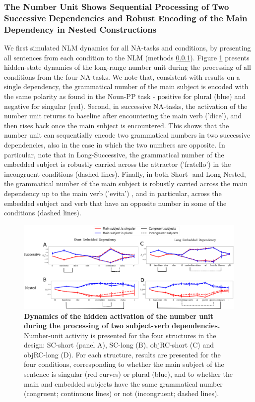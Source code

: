 \subsubsection{The Number Unit Shows Sequential Processing of Two Successive Dependencies and Robust Encoding of the Main Dependency in Nested Constructions}
We first simulated NLM dynamics for all NA-tasks and conditions, by presenting all sentences from each condition to the NLM (methods \ref{}). Figure \ref{fig:2by2_dynamics} presents hidden-state dynamics  of the long-range number unit during the processing of all conditions from the four NA-tasks. We note that, consistent with results on a single dependency, the grammatical number of the main subject is encoded with the same polarity as found in the Noun-PP task - positive for plural (blue) and negative for singular (red). Second, in successive NA-tasks, the activation of the number unit returns to baseline after encountering the main verb ('dice'), and then rises back once the main subject is encountered. This shows that the number unit can sequentially encode two grammatical numbers in two successive dependencies, also in the case in which the two numbers are opposite. In particular, note that in Long-Successive, the grammatical number of the embedded subject is robustly carried across the attractor ('fratello') in the incongruent conditions (dashed lines). Finally, in both Short- and Long-Nested, the grammatical number of the main subject is robustly carried across the main dependency up to the main verb ('evita') , and in particular, across the embedded subject and verb that have an opposite number in some of the conditions (dashed lines).

\begin{figure}
    \centering
    \includegraphics[width=\textwidth]{figures/model_activations.png}
    \caption{\textbf{Dynamics of the hidden activation of the number unit during the processing of two subject-verb dependencies.} Number-unit activity is presented for the four structures in the design: SC-short (panel A), SC-long (B), objRC-short (C) and objRC-long (D). For each structure, results are presented for the four conditions, corresponding to whether the main subject of the sentence is singular (red curves) or plural (blue), and to whether the main and embedded subjects have the same grammatical number (congruent; continuous lines) or not (incongruent; dashed lines).}
    \label{fig:2by2_dynamics}
\end{figure}


